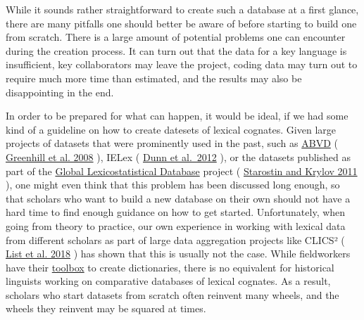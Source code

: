 \documentclass[
  a4paper,
  14pt,
  oneside,
  tablecaptionabove
]{scrbook}
\begin{document}
While it sounds rather straightforward to create such a database at a
first glance, there are many pitfalls one should better be aware of
before starting to build one from scratch. There is a large amount of
potential problems one can encounter during the creation process. It can
turn out that the data for a key language is insufficient, key
collaborators may leave the project, coding data may turn out to require
much more time than estimated, and the results may also be disappointing
in the end.

In order to be prepared for what can happen, it would be ideal, if we
had some kind of a guideline on how to create datesets of lexical
cognates. Given large projects of datasets that were prominently used in
the past, such as \href{https://abvd.shh.mpg.de}{ABVD} (
\href{http://bibliography.lingpy.org?key=Greenhill2008}{Greenhill et al.
2008} ), IELex ( \href{http://bibliography.lingpy.org?key=Dunn2012}{Dunn
et al.~2012} ), or the datasets published as part of the
\href{http://starling.rinet.ru/new100/}{Global Lexicostatistical
Database} project (
\href{http://bibliography.lingpy.org?key=Starostin2011}{Starostin and
Krylov 2011} ), one might even think that this problem has been
discussed long enough, so that scholars who want to build a new database
on their own should not have a hard time to find enough guidance on how
to get started. Unfortunately, when going from theory to practice, our
own experience in working with lexical data from different scholars as
part of large data aggregation projects like CLICS² (
\href{http://bibliography.lingpy.org?key=List2018f}{List et al. 2018} )
has shown that this is usually not the case. While fieldworkers have
their \href{https://software.sil.org/toolbox/}{toolbox} to create
dictionaries, there is no equivalent for historical linguists working on
comparative databases of lexical cognates. As a result, scholars who
start datasets from scratch often reinvent many wheels, and the wheels
they reinvent may be squared at times.
\end{document}
